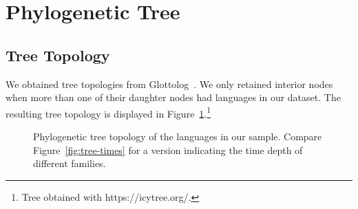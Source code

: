 \documentclass[11pt,a4paper]{article}
\begin{document}
\section{Phylogenetic Tree}

\subsection{Tree Topology}

We obtained tree topologies from Glottolog~\citep{nordhoff2011glottolog}.
We only retained interior nodes when more than one of their daughter nodes had languages in our dataset.
The resulting tree topology is displayed in Figure~\ref{fig:tree}.\footnote{Tree obtained with https://icytree.org/.}


\begin{figure}
    \centering
       \caption{Phylogenetic tree topology of the languages in our sample. Compare Figure~\ref{fig:tree-times} for a version indicating the time depth of different families.}
    \label{fig:tree}
\end{figure}
\end{document}
